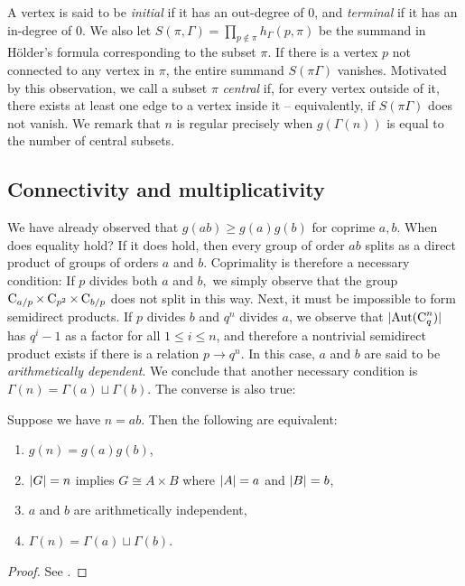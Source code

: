 A vertex is said to be \emph{initial} if it has an out-degree of $0$, and \emph{terminal} if it has an in-degree of $0$.
We also let $S(\pi, \Gamma) = \prod_{p \notin \pi}h_\Gamma(p, \pi)$ be the summand in Hölder's formula corresponding to the subset $\pi$.
If there is a vertex $p$ not connected to any vertex in $\pi$, the entire summand $S(\pi \Gamma)$ vanishes.
Motivated by this observation, we call a subset $\pi$ \emph{central} if, for every vertex outside of it, there exists at least one edge to a vertex inside it -- equivalently, if $S(\pi \Gamma)$ does not vanish.
We remark that $n$ is regular precisely when $g(\Gamma(n))$ is equal to the number of central subsets.

\subsection{Connectivity and multiplicativity}
We have already observed that $g(ab) \ge g(a)g(b)$ for coprime $a, b$.
When does equality hold? If it does hold, then every group of order $ab$ splits as a direct product of groups of orders $a$ and $b$.
Coprimality is therefore a necessary condition: If $p$ divides both $a$ and $b,$ we simply observe that the group $\operatorname{C}_{a/p} \times \operatorname{C}_{p^2} \times \operatorname{C}_{b/p}$ does not split in this way.
Next, it must be impossible to form semidirect products.
If $p$ divides $b$ and $q^n$ divides $a$, we observe that $\lvert\operatorname{Aut}(\operatorname{C}_{q}^n)\rvert$ has $q^i - 1$ as a factor for all $1 \le i \le n$, and therefore a nontrivial semidirect product exists if there is a relation $p \to q^n$.
In this case, $a$ and $b$ are said to be \emph{arithmetically dependent}.
We conclude that another necessary condition is $\Gamma(n) = \Gamma(a) \sqcup \Gamma(b)$.
 The converse is also true:

\begin{thm}
	Suppose we have $n = ab$.
Then the following are equivalent:
	\begin{enumerate}
		\item $g(n) = g(a)g(b)$,
		\item $\lvert G\rvert = n$ implies $G \cong A \times B$ where $\lvert A\rvert = a$ and $\lvert B\rvert = b$,
		\item $a$ and $b$ are arithmetically independent,
		\item $\Gamma(n) = \Gamma(a) \sqcup \Gamma(b)$.
	\end{enumerate}
\end{thm}
\begin{proof}
	See {\cite[Lem.~21.19]{monolith}}.
\end{proof}

